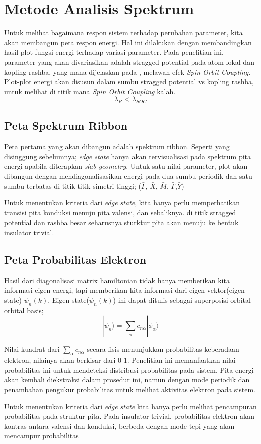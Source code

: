 \section{Metode Analisis Spektrum}
Untuk melihat bagaimana respon sistem terhadap perubahan parameter, kita akan membangun peta respon energi. Hal ini dilakukan dengan membandingkan hasil plot fungsi energi terhadap variasi parameter. Pada penelitian ini, parameter yang akan divariasikan adalah stragged potential pada atom lokal dan kopling rashba, yang mana dijelaskan pada \parencite{PhysRevLett.95.226801}, melawan efek \textit{Spin Orbit Coupling}. Plot-plot energi akan disusun dalam sumbu stragged potential vs kopling rashba, untuk melihat di titik mana \textit{Spin Orbit Coupling} kalah.
\[
  \lambda_R < \lambda_{SOC}
\]
\subsection{Peta Spektrum Ribbon}
Peta pertama yang akan dibangun adalah spektrum ribbon. Seperti yang disinggung sebelumnya; \textit{edge state} hanya akan tervisualisasi pada spektrum pita energi apabila diterapkan \textit{slab geometry}. Untuk satu nilai parameter, plot akan dibangun dengan mendiagonalisasikan energi pada dua sumbu periodik dan satu sumbu terbatas di titik-titik simetri tinggi; ($\bar{\Gamma}$, $\bar{X}$, $\bar{M}$, $\bar{\Gamma}$,$\bar{Y}$)


\par 
Untuk menentukan kriteria dari \textit{edge state}, kita hanya perlu memperhatikan transisi pita konduksi menuju pita valensi, dan sebaliknya. di titik stragged potential dan rashba besar seharusnya sturktur pita akan menuju ke bentuk insulator trivial.
\subsection{Peta Probabilitas Elektron}
Hasil dari diagonalisasi matrix hamiltonian tidak hanya memberikan kita informasi eigen energi, tapi memberikan kita informasi dari eigen vektor(eigen state) $\psi_n(k)$. Eigen state($\psi_n(k)$) ini dapat ditulis sebagai superposisi orbital-orbital basis;
\[
|\psi_n\rangle = \sum_{\alpha}c_{n\alpha}|\phi_\alpha\rangle\]
\par
Nilai kuadrat dari $\sum_{\alpha}c_{n\alpha}$ secara fisis menunjukkan probabilitas keberadaan elektron, nilainya akan berkisar dari 0-1. Penelitian ini memanfaatkan nilai probabilitas ini untuk mendeteksi distribusi probabilitas pada sistem. Pita energi akan kembali diekstraksi dalam prosedur ini, namun dengan mode periodik dan penambahan pengukur probabilitas untuk melihat aktivitas elektron pada sistem.
\par
Untuk menentukan kriteria dari \textit{edge state} kita hanya perlu melihat pencampuran probabilitas pada struktur pita. Pada insulator trivial, probabilitas elektron akan kontras antara valensi dan konduksi, berbeda dengan mode tepi yang akan mencampur probabilitas \parencite{PhysRevB.111.205139}
